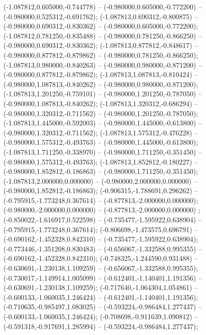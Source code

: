  (-1.087812,0.605000,-0.744778) -- (-0.980000,0.605000,-0.772200) -- (-0.980000,0.525312,-0.691762);
 (-1.087813,0.690312,-0.800875) -- (-0.980000,0.690312,-0.830362) -- (-0.980000,0.605000,-0.772200);
 (-1.087812,0.781250,-0.835488) -- (-0.980000,0.781250,-0.866250) -- (-0.980000,0.690312,-0.830362);
 (-1.087813,0.877812,-0.848617) -- (-0.980000,0.877812,-0.879862) -- (-0.980000,0.781250,-0.866250);
 (-1.087813,0.980000,-0.840263) -- (-0.980000,0.980000,-0.871200) -- (-0.980000,0.877812,-0.879862);
 (-1.087813,1.087813,-0.810424) -- (-0.980000,1.087813,-0.840262) -- (-0.980000,0.980000,-0.871200);
 (-1.087813,1.201250,-0.759101) -- (-0.980000,1.201250,-0.787050) -- (-0.980000,1.087813,-0.840262);
 (-1.087813,1.320312,-0.686294) -- (-0.980000,1.320312,-0.711562) -- (-0.980000,1.201250,-0.787050);
 (-1.087813,1.445000,-0.592003) -- (-0.980000,1.445000,-0.613800) -- (-0.980000,1.320312,-0.711562);
 (-1.087813,1.575312,-0.476228) -- (-0.980000,1.575312,-0.493763) -- (-0.980000,1.445000,-0.613800);
 (-1.087813,1.711250,-0.338970) -- (-0.980000,1.711250,-0.351450) -- (-0.980000,1.575312,-0.493763);
 (-1.087813,1.852812,-0.180227) -- (-0.980000,1.852812,-0.186863) -- (-0.980000,1.711250,-0.351450);
 (-1.087813,2.000000,0.000000) -- (-0.980000,2.000000,0.000000) -- (-0.980000,1.852812,-0.186863);
 (-0.906315,-1.788691,0.296262) -- (-0.795915,-1.773248,0.367614) -- (-0.877813,-2.000000,0.000000);
 (-0.980000,-2.000000,0.000000) -- (-0.877813,-2.000000,0.000000) ;
 (-0.850022,-1.616917,0.522598) -- (-0.735477,-1.595922,0.638904) -- (-0.795915,-1.773248,0.367614);
 (-0.806698,-1.473575,0.696791) -- (-0.690162,-1.452328,0.842310) -- (-0.735477,-1.595922,0.638904);
 (-0.773446,-1.351208,0.830483) -- (-0.656067,-1.332588,0.995355) -- (-0.690162,-1.452328,0.842310);
 (-0.748325,-1.244590,0.931488) -- (-0.630691,-1.230138,1.109259) -- (-0.656067,-1.332588,0.995355);
 (-0.730017,-1.149914,1.005099) -- (-0.612401,-1.140401,1.191356) -- (-0.630691,-1.230138,1.109259);
 (-0.717640,-1.064304,1.054861) -- (-0.600133,-1.060035,1.246424) -- (-0.612401,-1.140401,1.191356);
 (-0.710635,-0.985497,1.083025) -- (-0.593224,-0.986484,1.277437) -- (-0.600133,-1.060035,1.246424);
 (-0.708698,-0.911639,1.090812) -- (-0.591318,-0.917691,1.285994) -- (-0.593224,-0.986484,1.277437);
